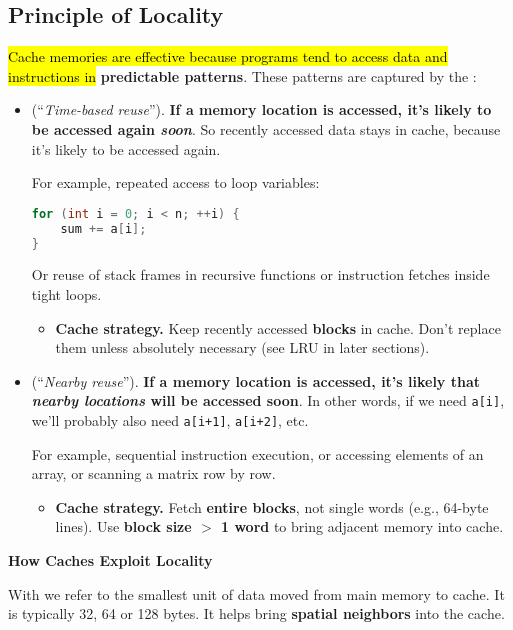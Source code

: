 \subsection{Principle of Locality}

\hl{Cache memories are effective because programs tend to access data and instructions in} \textbf{predictable patterns}. These patterns are captured by the :
\begin{itemize}
    \item {} (``\emph{Time-based reuse}''). \textbf{If a memory location is accessed, it's likely to be accessed again \emph{soon}}. So recently accessed data stays in cache, because it's likely to be accessed again.
    
    For example, repeated access to loop variables:
    \begin{lstlisting}[language=c]
for (int i = 0; i < n; ++i) {
    sum += a[i];
}\end{lstlisting}
    Or reuse of stack frames in recursive functions or instruction fetches inside tight loops.
    \begin{itemize}
        \item[\textcolor{Green3}{\faIcon{tools}}] \textcolor{Green3}{\textbf{Cache strategy.}} Keep recently accessed \textbf{blocks} in cache. Don't replace them unless absolutely necessary (see LRU in later sections).
    \end{itemize}


    \item {} (``\emph{Nearby reuse}''). \textbf{If a memory location is accessed, it's likely that \emph{nearby locations} will be accessed soon}. In other words, if we need \texttt{a[i]}, we'll probably also need \texttt{a[i+1]}, \texttt{a[i+2]}, etc.

    For example, sequential instruction execution, or accessing elements of an array, or scanning a matrix row by row.
    
    \begin{itemize}
        \item[\textcolor{Green3}{\faIcon{tools}}] \textcolor{Green3}{\textbf{Cache strategy.}} Fetch \textbf{entire blocks}, not single words (e.g., 64-byte lines). Use \textbf{block size $>$ 1 word} to bring adjacent memory into cache.
    \end{itemize}
\end{itemize}

\highspace
\begin{flushleft}
    \textcolor{Green3}{ \textbf{How Caches Exploit Locality}}
\end{flushleft}
With  we refer to the smallest unit of data moved from main memory to cache. It is typically 32, 64 or 128 bytes. It helps bring \textbf{spatial neighbors} into the cache.

